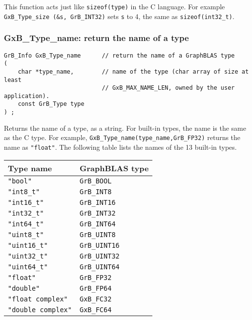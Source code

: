 \documentclass[12pt]{article}
\begin{document}
This function acts just like \verb'sizeof(type)' in the C language.  For
example \verb'GxB_Type_size (&s, GrB_INT32)' sets \verb's' to 4, the same as
\verb'sizeof(int32_t)'.

\newpage
\subsubsection{{\sf GxB\_Type\_name:} return the name of a type}
\label{type_name}

\begin{mdframed}[userdefinedwidth=6in]
{\footnotesize
\begin{verbatim}
GrB_Info GxB_Type_name      // return the name of a GraphBLAS type
(
    char *type_name,        // name of the type (char array of size at least
                            // GxB_MAX_NAME_LEN, owned by the user application).
    const GrB_Type type
) ;
\end{verbatim}
}\end{mdframed}

Returns the name of a type, as a string.  For built-in types, the name is
the same as the C type.  For example, \verb'GxB_Type_name(type_name,GrB_FP32)'
returns the name as \verb'"float"'.  The following table lists the
names of the 13 built-in types.

\vspace{0.2in}
{\small
\begin{tabular}{ll}
\hline
Type name & GraphBLAS type \\
\hline
    \verb'"bool"'           & \verb'GrB_BOOL' \\
    \verb'"int8_t"'         & \verb'GrB_INT8' \\
    \verb'"int16_t"'        & \verb'GrB_INT16' \\
    \verb'"int32_t"'        & \verb'GrB_INT32' \\
    \verb'"int64_t"'        & \verb'GrB_INT64' \\
    \verb'"uint8_t"'        & \verb'GrB_UINT8' \\
    \verb'"uint16_t"'       & \verb'GrB_UINT16' \\
    \verb'"uint32_t"'       & \verb'GrB_UINT32' \\
    \verb'"uint64_t"'       & \verb'GrB_UINT64' \\
    \verb'"float"'          & \verb'GrB_FP32' \\
    \verb'"double"'         & \verb'GrB_FP64' \\
    \verb'"float complex"'  & \verb'GxB_FC32' \\
    \verb'"double complex"' & \verb'GxB_FC64' \\
\hline
\end{tabular}}
\end{document}
